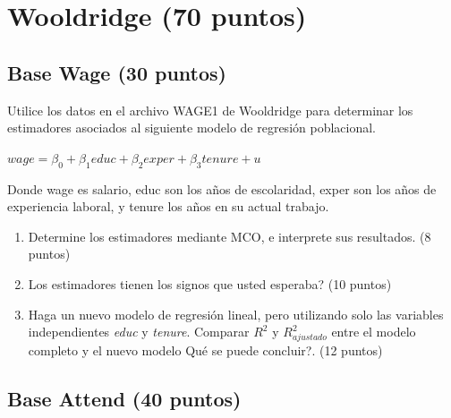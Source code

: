 \documentclass[letterpaper,11pt]{article}
\begin{document}
\section{Wooldridge  (70 puntos)}

\subsection{Base Wage (30 puntos)}

Utilice los datos en el archivo WAGE1 de Wooldridge para determinar los estimadores asociados al  siguiente modelo de regresión poblacional.

$wage=\beta_0+ \beta_1educ +\beta_2exper+ \beta_3tenure+u$


Donde wage es salario, educ son los años de escolaridad, 
exper son los años de experiencia laboral, y tenure los años en su actual trabajo.

\begin{enumerate}



\item Determine los estimadores mediante MCO, e interprete sus resultados. (8 puntos)



\item \textquestiondown Los estimadores tienen los signos que usted esperaba? (10 puntos)


\item Haga un nuevo modelo de regresión lineal, pero utilizando solo las variables independientes \textit{educ} y \textit{tenure}. Comparar $R^2$ y $R^2_{ajustado}$ entre el modelo completo y el nuevo modelo \textquestiondown Qué se puede concluir?. (12 puntos)




\end{enumerate}

\subsection{Base Attend (40 puntos)}
\end{document}
